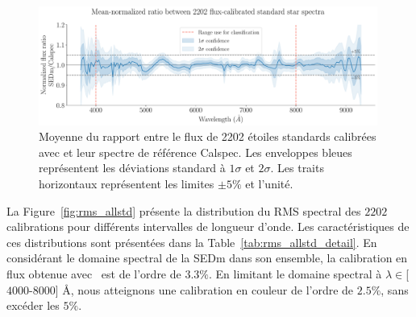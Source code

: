 \documentclass[../main/main.tex]{subfiles}
\begin{document}
\begin{figure}[ht]
  \centering
  \includegraphics[width=0.99\textwidth]{../figures/06_irf/fluxcalstd_all_ratio.pdf}
  \caption[Moyenne du ratio entre le flux de 2202
  étoiles standards et leur spectre de
  référence.]{Moyenne du rapport entre le flux de 2202
    étoiles standards calibrées avec \hypergal et leur spectre de
    référence Calspec. Les enveloppes bleues représentent les déviations
    standard à $1\sigma$ et $2\sigma$. Les traits horizontaux représentent
    les limites $\pm5\%$ et l'unité.}
  \label{fig:allratio_std}
\end{figure}

La Figure~\ref{fig:rms_allstd} présente la distribution du RMS spectral
des $2202$ calibrations 
pour différents intervalles de longueur d'onde. Les caractéristiques de
ces distributions sont présentées dans la Table~\ref{tab:rms_allstd_detail}. En
considérant le domaine spectral de la SEDm dans son ensemble, la
calibration en flux obtenue avec \hypergal\ est de l'ordre de $3.3\%$. En
limitant le domaine spectral à $\lambda\in$[$4000$-$8000$] \AA, nous
atteignons une calibration en couleur de l'ordre de $2.5\%$, sans excéder les $5\%$. 
\end{document}
